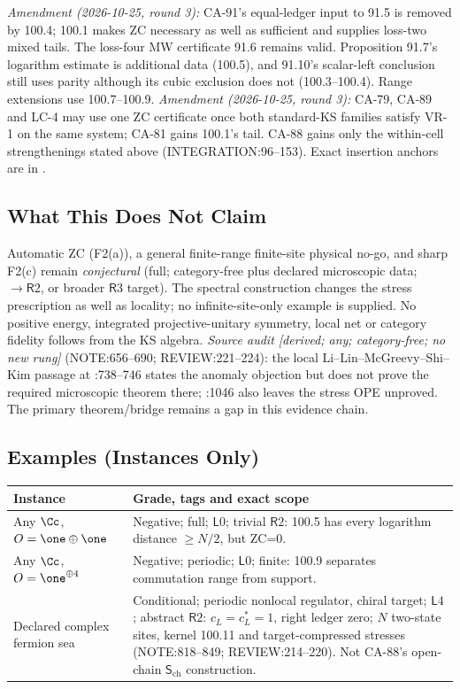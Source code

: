 \emph{Amendment (2026-10-25, round 3):} CA-91's equal-ledger input to 91.5 is removed by 100.4;
100.1 makes ZC necessary as well as sufficient and supplies loss-two mixed tails. The loss-four MW certificate
91.6 remains valid. Proposition 91.7's logarithm estimate is additional data (100.5), and 91.10's scalar-left conclusion still uses parity although its cubic exclusion does not (100.3--100.4). Range extensions use 100.7--100.9.
\emph{Amendment (2026-10-25, round 3):} CA-79, CA-89 and LC-4 may use one ZC certificate once both
standard-KS families satisfy VR-1 on the same system; CA-81 gains 100.1's tail. CA-88 gains only the within-cell strengthenings stated above (INTEGRATION:96--153). Exact insertion anchors are in .

\subsection{What This Does Not Claim}

Automatic ZC (F2(a)), a general finite-range finite-site physical no-go, and sharp F2(c) remain
\emph{conjectural} (full; category-free plus declared microscopic data; \(\to\mathsf R2\), or broader \(\mathsf R3\) target).
The spectral construction changes the stress prescription as well as locality; no infinite-site-only example is supplied. No positive energy, integrated projective-unitary symmetry, local net or category fidelity follows from the KS algebra.
\emph{Source audit [derived; any; category-free; no new rung]} (NOTE:656--690; REVIEW:221--224): the local
Li--Lin--McGreevy--Shi--Kim passage at :738--746 states the anomaly objection but does not prove the required microscopic
theorem there; :1046 also leaves the stress OPE unproved. The primary theorem/bridge remains a gap in this evidence chain.

\subsection{Examples (Instances Only)}

\begin{center}\footnotesize
\begin{tabular}{p{3.2cm}p{10.7cm}}\toprule
Instance & Grade, tags and exact scope \\\midrule
Any \(\Cc\), \(O=\one\oplus\one\) & Negative; full; \(\mathsf L0\); trivial \(\mathsf R2\): 100.5 has every logarithm distance \(\ge N/2\), but ZC=0. \\
Any \(\Cc\), \(O=\one^{\oplus4}\) & Negative; periodic; \(\mathsf L0\); finite: 100.9 separates commutation range from support. \\
Declared complex fermion sea & Conditional; periodic nonlocal regulator, chiral target; \(\mathsf L4\); abstract \(\mathsf R2\): \(c_L=c_L^*=1\), right ledger zero; \(N\) two-state sites, kernel 100.11 and target-compressed stresses (NOTE:818--849; REVIEW:214--220). Not CA-88's open-chain \(\mathsf S_{\mathrm{ch}}\) construction. \\
\bottomrule\end{tabular}
\end{center}

